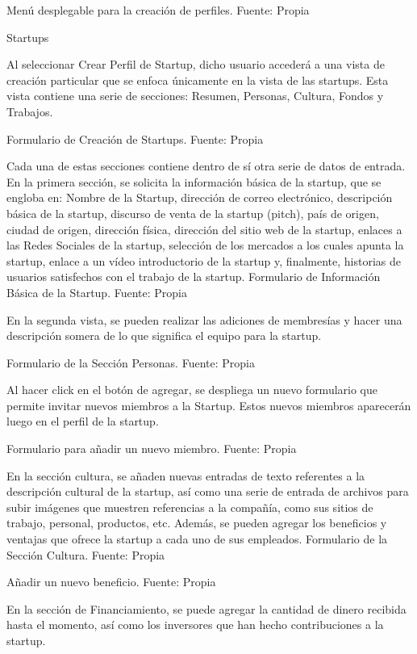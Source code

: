 Menú desplegable para la creación de perfiles. Fuente: Propia

Startups	

Al seleccionar Crear Perfil de Startup, dicho usuario accederá a una vista de creación particular que se enfoca únicamente en la vista de las startups. Esta vista contiene una serie de secciones: Resumen, Personas, Cultura, Fondos y Trabajos.

Formulario de Creación de Startups. Fuente: Propia

Cada una de estas secciones contiene dentro de sí otra serie de datos de entrada. En la primera sección, se solicita la información básica de la startup, que se engloba en: Nombre de la Startup, dirección de correo electrónico, descripción básica de la startup, discurso de venta de la startup (pitch), país de origen, ciudad de origen, dirección física, dirección del sitio web de la startup, enlaces a las Redes Sociales de la startup, selección de los mercados a los cuales apunta la startup, enlace a un vídeo introductorio de la startup y, finalmente, historias de usuarios satisfechos con el trabajo de la startup.
Formulario de Información Básica de la Startup. Fuente: Propia

En la segunda vista, se pueden realizar las adiciones de membresías y hacer una descripción somera de lo que significa el equipo para la startup.

Formulario de la Sección Personas. Fuente: Propia

Al hacer click en el botón de agregar, se despliega un nuevo formulario que permite invitar nuevos miembros a la Startup. Estos nuevos miembros aparecerán luego en el perfil de la startup.

Formulario para añadir un nuevo miembro. Fuente: Propia

En la sección cultura, se añaden nuevas entradas de texto referentes a la descripción cultural de la startup, así como una serie de entrada de archivos para subir imágenes que muestren referencias a la compañía, como sus sitios de trabajo, personal, productos, etc. Además, se pueden agregar los beneficios y ventajas que ofrece la startup a cada uno de sus empleados.
Formulario de la Sección Cultura. Fuente: Propia

Añadir un nuevo beneficio. Fuente: Propia

En la sección de Financiamiento, se puede agregar la cantidad de dinero recibida hasta el momento, así como los inversores que han hecho contribuciones a la startup.

